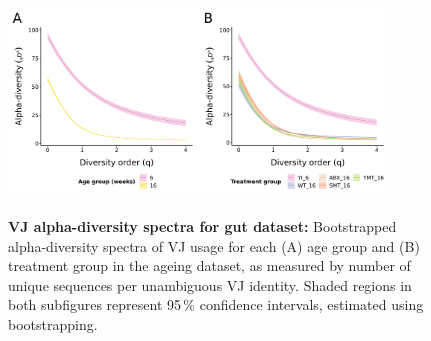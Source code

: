 \begin{figure}
\centering
\includegraphics[width = 0.9\textwidth]{_Figures/png/igseq-gut-VJ-diversity-alpha}
\begin{subfigure}{0em}
\label{fig:igseq-gut-VJ-diversity-alpha-age}
\end{subfigure}
\begin{subfigure}{0em}
\label{fig:igseq-gut-VJ-diversity-alpha-groups}
\end{subfigure}
\caption[VJ alpha-diversity spectra for \igseq gut dataset]{\textbf{VJ alpha-diversity spectra for \igseq gut dataset:} Bootstrapped alpha-diversity spectra of VJ usage for each (A) age group and (B) treatment group in the \igseq ageing dataset, as measured by number of unique sequences per unambiguous VJ identity. Shaded regions in both subfigures represent 95\,\% confidence intervals, estimated using bootstrapping.}
\label{fig:igseq-gut-VJ-diversity-alpha}
\end{figure}

